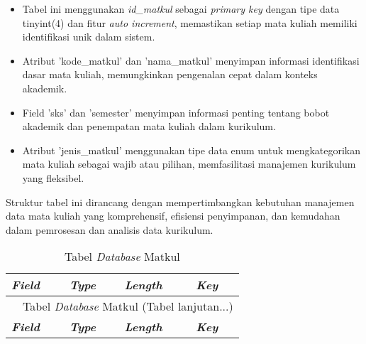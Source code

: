 \begin{enumerate}
	      \begin{itemize}
		      \item Tabel ini menggunakan \textit{id\_matkul} sebagai \textit{primary key} dengan tipe data tinyint(4) dan fitur \textit{auto increment}, memastikan setiap mata kuliah memiliki identifikasi unik dalam sistem.
		      \item Atribut 'kode\_matkul' dan 'nama\_matkul' menyimpan informasi identifikasi dasar mata kuliah, memungkinkan pengenalan cepat dalam konteks akademik.
		      \item Field 'sks' dan 'semester' menyimpan informasi penting tentang bobot akademik dan penempatan mata kuliah dalam kurikulum.
		      \item Atribut 'jenis\_matkul' menggunakan tipe data enum untuk mengkategorikan mata kuliah sebagai wajib atau pilihan, memfasilitasi manajemen kurikulum yang fleksibel.
	      \end{itemize}

	      Struktur tabel ini dirancang dengan mempertimbangkan kebutuhan manajemen data mata kuliah yang komprehensif, efisiensi penyimpanan, dan kemudahan dalam pemrosesan dan analisis data kurikulum.

		      {
			      \fontsize{10}{12}\selectfont
			      \begin{longtable}{l l l l}
				      \caption{Tabel \textit{\textit{Database}} Matkul}
				      \label{admin}                                                                                                   \\
				      \hline
				      \textbf{\textit{Field}} & \textbf{\textit{Type}} & \textbf{\textit{Length}} & \textbf{\textit{Key}}             \\
				      \hline
				      \endfirsthead

				      \multicolumn{4}{c}{\tablename\ \thetable\ {Tabel \textit{\textit{Database}} Matkul} \space (Tabel lanjutan...)} \\
				      \hline
				      \textbf{\textit{Field}} & \textbf{\textit{Type}} & \textbf{\textit{Length}} & \textbf{\textit{Key}}             \\
				      \hline
				      \endhead


\end{longtable}}
\end{enumerate}
